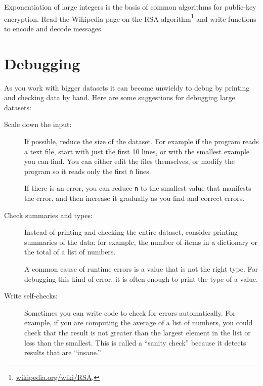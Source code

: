 \documentclass[10pt]{book}
\begin{document}
{\begin{ex}


Exponentiation of large integers is the basis of common
algorithms for public-key encryption.  Read the Wikipedia
page on the RSA algorithm\footnote{\url{wikipedia.org/wiki/RSA}.}
and write functions to encode and decode messages.

\end{ex}


\section{Debugging}
As you work with bigger datasets it can become unwieldy to
debug by printing and checking data by hand.  Here are some
suggestions for debugging large datasets:

\begin{description}

\item[Scale down the input:] If possible, reduce the size of the
dataset.  For example if the program reads a text file, start with
just the first 10 lines, or with the smallest example you can find.
You can either edit the files themselves, or modify the
program so it reads only the first {\tt n} lines.

If there is an error, you can reduce {\tt n} to the smallest
value that manifests the error, and then increase it gradually
as you find and correct errors.

\item[Check summaries and types:] Instead of printing and checking the
entire dataset, consider printing summaries of the data: for example,
the number of items in a dictionary or the total of a list of numbers.

A common cause of runtime errors is a value that is not the right
type.  For debugging this kind of error, it is often enough to print
the type of a value.

\item[Write self-checks:]  Sometimes you can write code to check
for errors automatically.  For example, if you are computing the
average of a list of numbers, you could check that the result is
not greater than the largest element in the list or less than
the smallest.  This is called a ``sanity check'' because it detects
results that are ``insane.''



\end{description}}
\end{document}
